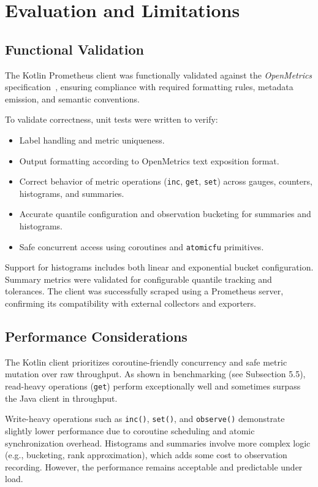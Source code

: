 \chapter{Evaluation and Limitations} \label{cap:evaluation}

\section{Functional Validation}

The Kotlin Prometheus client was functionally validated against the \textit{OpenMetrics} specification~\cite{openmetrics-spec}, ensuring compliance with required formatting rules, metadata emission, and semantic conventions.

To validate correctness, unit tests were written to verify:
\begin{itemize}
  \item Label handling and metric uniqueness.
  \item Output formatting according to OpenMetrics text exposition format.
  \item Correct behavior of metric operations (\texttt{inc}, \texttt{get}, \texttt{set}) across gauges, counters, histograms, and summaries.
  \item Accurate quantile configuration and observation bucketing for summaries and histograms.
  \item Safe concurrent access using coroutines and \texttt{atomicfu} primitives.
\end{itemize}

Support for histograms includes both linear and exponential bucket configuration. Summary metrics were validated for configurable quantile tracking and tolerances. The client was successfully scraped using a Prometheus server, confirming its compatibility with external collectors and exporters.

\section{Performance Considerations}

The Kotlin client prioritizes coroutine-friendly concurrency and safe metric mutation over raw throughput. As shown in benchmarking (see Subsection 5.5), read-heavy operations (\texttt{get}) perform exceptionally well and sometimes surpass the Java client in throughput.

Write-heavy operations such as \texttt{inc()}, \texttt{set()}, and \texttt{observe()} demonstrate slightly lower performance due to coroutine scheduling and atomic synchronization overhead. Histograms and summaries involve more complex logic (e.g., bucketing, rank approximation), which adds some cost to observation recording. However, the performance remains acceptable and predictable under load.

